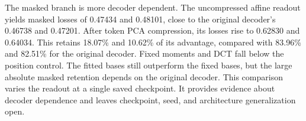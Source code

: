 The masked branch is more decoder dependent. The uncompressed affine readout yields masked losses of 0.47434 and 0.48101, close to the original decoder's 0.46738 and 0.47201. After token PCA compression, its losses rise to 0.62830 and 0.64034. This retains 18.07\% and 10.62\% of its advantage, compared with 83.96\% and 82.51\% for the original decoder. Fixed moments and DCT fall below the position control. The fitted bases still outperform the fixed bases, but the large absolute masked retention depends on the original decoder. This comparison varies the readout at a single saved checkpoint. It provides evidence about decoder dependence and leaves checkpoint, seed, and architecture generalization open.
